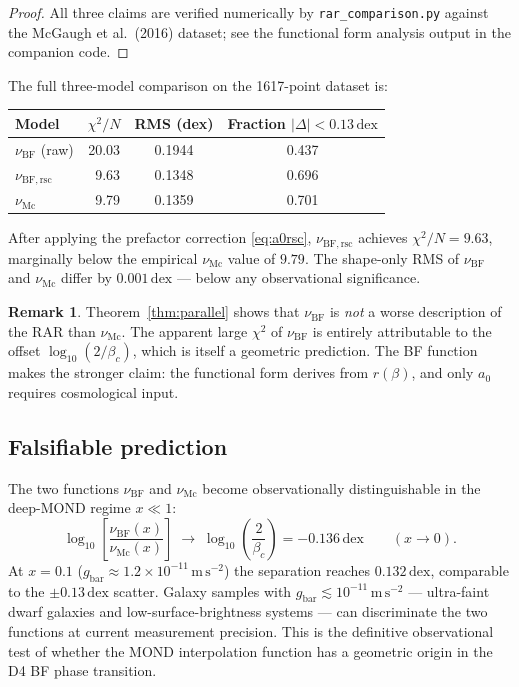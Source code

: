 \documentclass[12pt,a4paper]{article}
\theoremstyle{plain}
\theoremstyle{definition}
\newtheorem{remark}[theorem]{Remark}
\newcommand{\betac}{\beta_c}
\newcommand{\nuBF}{\nu_{\mathrm{BF}}}
\newcommand{\nuBFrsc}{\nu_{\mathrm{BF,rsc}}}
\newcommand{\nuMc}{\nu_{\mathrm{Mc}}}
\begin{document}
\begin{proof}
  All three claims are verified numerically by \texttt{rar\_comparison.py}
  against the McGaugh et al.\ (2016) dataset; see the functional form
  analysis output in the companion code.
\end{proof}

The full three-model comparison on the 1617-point dataset is:
\begin{center}
\begin{tabular}{lccc}
\toprule
Model & $\chi^2/N$ & RMS (dex) & Fraction $|\Delta|<0.13\,\mathrm{dex}$ \\
\midrule
$\nuBF$ (raw)     & 20.03 & 0.1944 & 0.437 \\
$\nuBFrsc$        & ~9.63 & 0.1348 & 0.696 \\
$\nuMc$           & ~9.79 & 0.1359 & 0.701 \\
\bottomrule
\end{tabular}
\end{center}

After applying the prefactor correction \eqref{eq:a0rsc},
$\nuBFrsc$ achieves $\chi^2/N = 9.63$, marginally below the empirical
$\nuMc$ value of $9.79$.  The shape-only RMS of $\nuBF$ and $\nuMc$
differ by $0.001\,\mathrm{dex}$ — below any observational significance.

\begin{remark}
  Theorem~\ref{thm:parallel} shows that $\nuBF$ is \emph{not} a worse
  description of the RAR than $\nuMc$.  The apparent large $\chi^2$ of
  $\nuBF$ is entirely attributable to the offset $\log_{10}(2/\betac)$,
  which is itself a geometric prediction.  The BF function makes the
  stronger claim: the functional form derives from $r(\beta)$, and only
  $a_0$ requires cosmological input.
\end{remark}

\subsection{Falsifiable prediction}

The two functions $\nuBF$ and $\nuMc$ become observationally distinguishable
in the deep-MOND regime $x \ll 1$:
\begin{equation}
  \log_{10}\!\left[\frac{\nuBF(x)}{\nuMc(x)}\right]
  \;\longrightarrow\; \log_{10}\!\left(\frac{2}{\betac}\right)
  = -0.136\,\mathrm{dex}
  \qquad (x \to 0).
\end{equation}
At $x = 0.1$ ($g_{\mathrm{bar}} \approx 1.2\times10^{-11}\,\mathrm{m\,s^{-2}}$)
the separation reaches $0.132\,\mathrm{dex}$, comparable to the
$\pm 0.13\,\mathrm{dex}$ scatter.  Galaxy samples with
$g_{\mathrm{bar}} \lesssim 10^{-11}\,\mathrm{m\,s^{-2}}$ — ultra-faint
dwarf galaxies and low-surface-brightness systems — can discriminate the
two functions at current measurement precision.  This is the definitive
observational test of whether the MOND interpolation function has a
geometric origin in the D4 BF phase transition.
\end{document}
